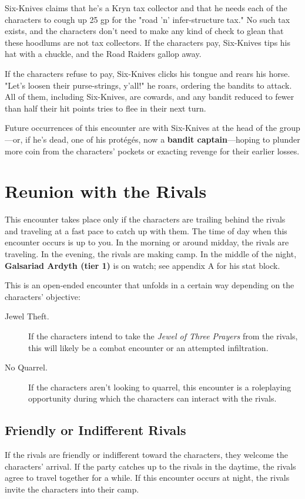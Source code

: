 \documentclass[10pt,a4paper,twoside,bg=print,twocolumn,openany,nodeprecatedcode]{dndbook}
\begin{document}
Six-Knives claims that he's a Kryn tax collector and that he needs each of the characters to cough up 25 gp for the "road 'n' infer-structure tax." No such tax exists, and the characters don't need to make any kind of check to glean that these hoodlums are not tax collectors. If the characters pay, Six-Knives tips his hat with a chuckle, and the Road Raiders gallop away.

If the characters refuse to pay, Six-Knives clicks his tongue and rears his horse. "Let's loosen their purse-strings, y'all!" he roars, ordering the bandits to attack. All of them, including Six-Knives, are cowards, and any bandit reduced to fewer than half their hit points tries to flee in their next turn.

Future occurrences of this encounter are with Six-Knives at the head of the group—or, if he's dead, one of his protégés, now a \textbf{bandit captain}—hoping to plunder more coin from the characters' pockets or exacting revenge for their earlier losses.

\section{Reunion with the Rivals}
This encounter takes place only if the characters are trailing behind the rivals and traveling at a fast pace to catch up with them. The time of day when this encounter occurs is up to you. In the morning or around midday, the rivals are traveling. In the evening, the rivals are making camp. In the middle of the night, \textbf{Galsariad Ardyth (tier 1)} is on watch; see appendix A for his stat block.

This is an open-ended encounter that unfolds in a certain way depending on the characters' objective:


\begin{description}
\item[Jewel Theft.]
If the characters intend to take the \textit{Jewel of Three Prayers} from the rivals, this will likely be a combat encounter or an attempted infiltration.
\item[No Quarrel.]
If the characters aren't looking to quarrel, this encounter is a roleplaying opportunity during which the characters can interact with the rivals.
\end{description}

\subsection{Friendly or Indifferent Rivals}
If the rivals are friendly or indifferent toward the characters, they welcome the characters' arrival. If the party catches up to the rivals in the daytime, the rivals agree to travel together for a while. If this encounter occurs at night, the rivals invite the characters into their camp.
\end{document}
